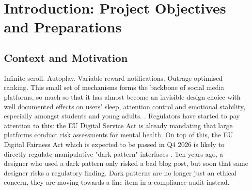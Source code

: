 \documentclass[11pt]{article}
\begin{document}
\clearpage
{}
\setcounter{page}{1}

\begin{abstract}
This project report documents the Stanford d.School design thinking process that produced MindfulFeed, a pro-social social media app that seeks to replace engagement-expanding dark patterns with meaningful, autonomy-preserving controls. The project team followed the five stages of Empathize, Define, Ideate, Prototype, and Test, culminating in three increasingly mature prototypes (low-, mid-, and high-fidelity) that were tested through cognitive walkthroughs and usability feedback. Along the way, the team conducted three semi-structured user interviews, synthesised an empathy map, constructed a primary persona, formulated a point-of-view statement and How-Might-We questions, and used the SCAMPER method and a Desirability-Feasibility-Profitability matrix for concept generation. The resulting record adds concrete detail to the choices designers make around personalisation, symmetric opt-in/opt-out consent, and fatigue-aware nudges, linking them back to user evidence as well as to the regulatory and behavioural-economics literature that frames the problem. A usage appendix discloses how and where the project team used generative AI tools.
\end{abstract}

\section{Introduction: Project Objectives and Preparations}

\subsection{Context and Motivation}
\label{sec:context_motivation}
Infinite scroll. Autoplay. Variable reward notifications. Outrage-optimised ranking. This small set of mechanisms forms the backbone of social media platforms, so much so that it has almost become an invisible design choice with well documented effects on users' sleep, attention control and emotional stability, especially amongst students and young adults. \parencites[11]{6644697}[6]{9300898}.
Regulators have started to pay attention to this: the EU Digital Service Act is already mandating that large platforms conduct risk assessments for mental health. On top of this, the EU Digital Fairness Act which is expected to be passed in Q4 2026 is likely to directly regulate manipulative "dark pattern" interfaces \parencites[12]{4969503}.
Ten years ago, a designer who used a dark pattern only risked a bad blog post, but soon that same designer risks a regulatory finding. Dark patterns are no longer just an ethical concern, they are moving towards a line item in a compliance audit instead.
\end{document}
